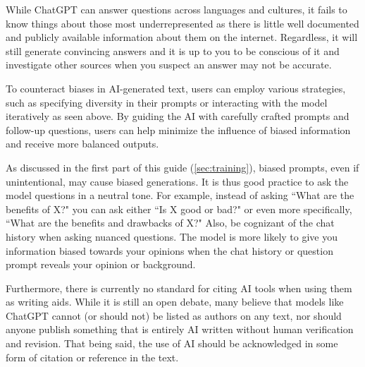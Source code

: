 \documentclass[12pt]{article}
\begin{document}

While ChatGPT can answer questions across languages and cultures, it fails to know things about those most underrepresented as there is little well documented and publicly available information about them on the internet. Regardless, it will still generate convincing answers and it is up to you to be conscious of it and investigate other sources when you suspect an answer may not be accurate.

To counteract biases in AI-generated text, users can employ various strategies, such as specifying diversity in their prompts or interacting with the model iteratively as seen above. By guiding the AI with carefully crafted prompts and follow-up questions, users can help minimize the influence of biased information and receive more balanced outputs.

As discussed in the first part of this guide (\ref{sec:training}), biased prompts, even if unintentional, may cause biased generations. It is thus good practice to ask the model questions in a neutral tone. For example, instead of asking ``What are the benefits of X?" you can ask either ``Is X good or bad?" or even more specifically, ``What are the benefits and drawbacks of X?" Also, be cognizant of the chat history when asking nuanced questions. The model is more likely to give you information biased towards your opinions when the chat history or question prompt reveals your opinion or background. 

Furthermore, there is currently no standard for citing AI tools when using them as writing aids. While it is still an open debate, many believe that models like ChatGPT cannot (or should not) be listed as authors on any text,
nor should anyone publish something that is entirely AI written without human verification and revision. That being said, the use of AI should be acknowledged in some form of citation or reference in the text.
\end{document}
